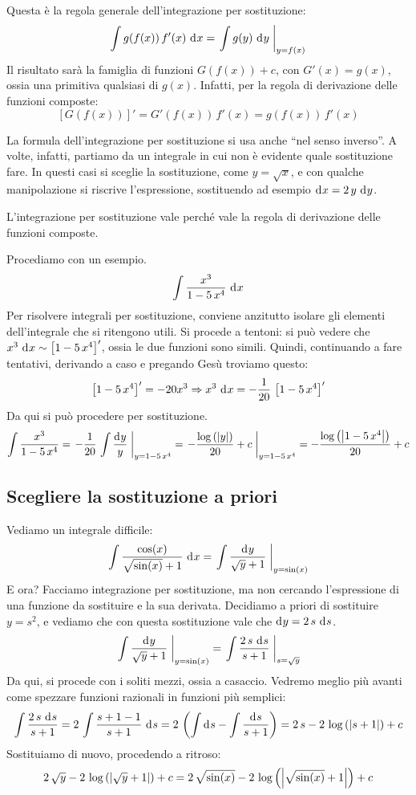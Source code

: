 \begin{defn}
Questa \`e la regola generale dell'integrazione per sostituzione:
\[
\int g(f(x)) \, f'(x) \dx = \substitute{\int g(y) \dx[y]}{y = f(x)}
\]
Il risultato sar\`a la famiglia di funzioni $G(f(x)) + c$, con $G'(x) = g(x)$, ossia una primitiva qualsiasi di $g(x)$. Infatti, per la regola di derivazione delle funzioni composte:
\[
\left[ G(f(x)) \right]' = G'(f(x)) \, f'(x) = g(f(x)) \, f'(x)
\]
\end{defn}
La formula dell'integrazione per sostituzione si usa anche ``nel senso inverso''. A volte, infatti, partiamo da un integrale in cui non \`e evidente quale sostituzione fare. In questi casi si sceglie la sostituzione, come $y = \sqrt{x}$, e con qualche manipolazione si riscrive l'espressione, sostituendo ad esempio $\diff x = 2 \, y \dx[y]$.

\begin{oss}
L'integrazione per sostituzione vale perch\'e vale la regola di derivazione delle funzioni composte.
\end{oss}

Procediamo con un esempio.
\[
\int \frac{x^3}{1 - 5 \, x^4} \dx
\]
Per risolvere integrali per sostituzione, conviene anzitutto isolare gli elementi dell'integrale che si ritengono utili. Si procede a tentoni: si pu\`o vedere che $x^3 \dx \sim \left[ 1 - 5 \, x^4 \right]'$, ossia le due funzioni sono simili. Quindi, continuando a fare tentativi, derivando a caso e pregando Ges\`u troviamo questo:
\[
\left[ 1 - 5 \, x^4 \right]' = - 20 x^3 \implies
x^3 \dx = - \frac{1}{20} \, \left[ 1 - 5 \, x^4 \right]'
\]
Da qui si pu\`o procedere per sostituzione.
\[
\int \frac{x^3}{1 - 5 \, x^4} = \substitute{- \frac{1}{20} \, \int \frac{\diff y}{y}}{y = 1 - 5 \, x^4} = \substitute{- \frac{\abslog{y}}{20} + c}{y = 1 - 5 \, x^4} = - \frac{\abslog{1 - 5 \, x^4}}{20} + c
\]

\subsection{Scegliere la sostituzione a priori}
\label{sostituzione_a_priori}

Vediamo un integrale difficile:
\[
\int \frac{\cos(x)}{\sqrt{\sin(x)} + 1} \dx = 
\substitute{\int \frac{\diff y}{\sqrt{y} + 1}}{y = \sin (x)}
\]
E ora? Facciamo integrazione per sostituzione, ma non cercando l'espressione di una funzione da sostituire e la sua derivata. Decidiamo a priori di sostituire $y = s^2$, e vediamo che con questa sostituzione vale che $\diff y = 2 \, s \dx[s]$.
\[
\substitute{\int \frac{\diff y}{\sqrt{y} + 1}}{y = \sin (x)} =
\substitute{\int \frac{2 \, s \dx[s]}{s + 1}}{s = \sqrt{y}}
\]
Da qui, si procede con i soliti mezzi, ossia a casaccio. Vedremo meglio pi\`u avanti come spezzare funzioni razionali in funzioni pi\`u semplici:
\[
\int \frac{2 \, s \dx[s]}{s + 1} = 
2 \, \int \frac{s + 1 - 1}{s + 1} \dx[s] = 
2 \, \left( \int \diff s - \int \frac {\diff s}{s + 1} \right) = 2 \, s - 2 \, \abslog{s + 1} + c
\]
Sostituiamo di nuovo, procedendo a ritroso:
\[
2 \, \sqrt{y} - 2 \, \log \left( \left\lvert{\sqrt{y} + 1}\right\rvert \right) + c =
2 \, \sqrt{\sin(x)} - 2 \, \log \left( \left\lvert{\sqrt{\sin (x)} + 1 }\right\rvert \right) + c
\]


